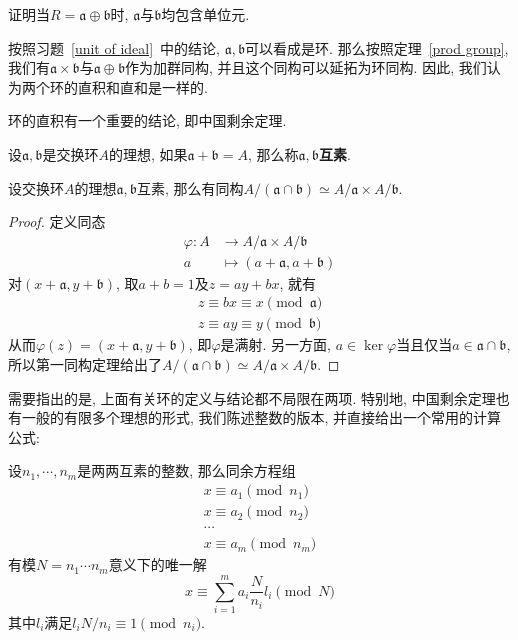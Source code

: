 \begin{ex}\label{unit of ideal}
    证明当$R=\mathfrak{a}\oplus\mathfrak{b}$时, $\mathfrak{a}$与$\mathfrak{b}$均包含单位元.
\end{ex}

按照习题~\ref{unit of ideal}~中的结论, $\mathfrak{a},\mathfrak{b}$可以看成是环.
那么按照定理~\ref{prod group}, 我们有$\mathfrak{a}\times\mathfrak{b}$与$\mathfrak{a}\oplus\mathfrak{b}$作为加群同构, 并且这个同构可以延拓为环同构.
因此, 我们认为两个环的直积和直和是一样的.

环的直积有一个重要的结论, 即中国剩余定理.
\begin{defn}
    设$\mathfrak{a},\mathfrak{b}$是交换环$A$的理想, 如果$\mathfrak{a}+\mathfrak{b}=A$, 那么称$\mathfrak{a},\mathfrak{b}$\textbf{互素}.
\end{defn}

\begin{thm}[中国剩余定理]
    设交换环$A$的理想$\mathfrak{a},\mathfrak{b}$互素, 那么有同构$A/(\mathfrak{a}\cap\mathfrak{b})\simeq A/\mathfrak{a}\times A/\mathfrak{b}$.
\end{thm}
\begin{proof}
    定义同态
    \begin{align*}
        \varphi:A&\to A/\mathfrak{a}\times A/\mathfrak{b}\\
        a&\mapsto (a+\mathfrak{a},a+\mathfrak{b})
    \end{align*}
    对$(x+\mathfrak{a},y+\mathfrak{b})$, 取$a+b=1$及$z=ay+bx$, 就有
    \begin{gather*}
        z\equiv bx\equiv x \pmod{\mathfrak{a}}\\
        z\equiv ay\equiv y \pmod{\mathfrak{b}}
    \end{gather*}
    从而$\varphi(z)=(x+\mathfrak{a},y+\mathfrak{b})$, 即$\varphi$是满射.
    另一方面, $a\in\ker\varphi$当且仅当$a\in\mathfrak{a}\cap\mathfrak{b}$, 所以第一同构定理给出了$A/(\mathfrak{a}\cap\mathfrak{b})\simeq A/\mathfrak{a}\times A/\mathfrak{b}$.
\end{proof}

需要指出的是, 上面有关环的定义与结论都不局限在两项.
特别地, 中国剩余定理也有一般的有限多个理想的形式, 我们陈述整数的版本, 并直接给出一个常用的计算公式:
\begin{thm}
    设$n_1,\cdots,n_m$是两两互素的整数, 那么同余方程组
    \begin{gather*}
        x\equiv a_1\pmod{n_1}\\
        x\equiv a_2\pmod{n_2}\\
        \cdots\\
        x\equiv a_m\pmod{n_m}
    \end{gather*}
    有模$N=n_1\cdots n_m$意义下的唯一解
    \[x\equiv\sum_{i=1}^ma_i\frac{N}{n_i}l_i\pmod{N}\]
    其中$l_i$满足$l_iN/n_i\equiv 1\pmod{n_i}$.
\end{thm}

